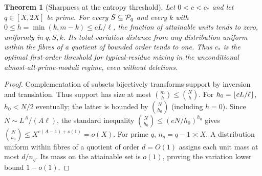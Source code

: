 \documentclass[11pt]{article}
\newtheorem{theorem}{Theorem}[section]
\theoremstyle{remark}\newtheorem{remark}[theorem]{Remark}
\begin{document}
\begin{theorem}[Sharpness at the entropy threshold]\label{thm:sharp}
Let $0<c<c_*$ and let $q\in[X,2X]$ be prime. For every $S\subseteq\mathcal P_q$ and every $k$ with $0\le h=\min(k,m-k)\le c L/\ell$, the fraction of attainable units tends to zero, uniformly in $q,S,k$. Its total variation distance from \emph{any} distribution uniform within the fibres of a quotient of bounded order tends to one. Thus $c_*$ is the optimal first-order threshold for typical-residue mixing in the unconditional almost-all-prime-moduli regime, even without deletions.
\end{theorem}
\begin{proof}
Complementation of subsets bijectively transforms support by inversion and translation. Thus support has size at most $\binom{m}{h}\le\binom{N}{h}$. For $h_0=\lfloor cL/\ell\rfloor$, $h_0<N/2$ eventually; the latter is bounded by $\binom{N}{h_0}$ (including $h=0$). Since $N\sim L^A/(A\ell)$, the standard inequality $\binom{N}{h_0}\le(eN/h_0)^{h_0}$ gives $\binom{N}{h_0}\le X^{c(A-1)+o(1)}=o(X)$. For prime $q$, $n_q=q-1\asymp X$. A distribution uniform within fibres of a quotient of order $d=O(1)$ assigns each unit mass at most $d/n_q$. Its mass on the attainable set is $o(1)$, proving the variation lower bound $1-o(1)$.
\end{proof}
\end{document}
